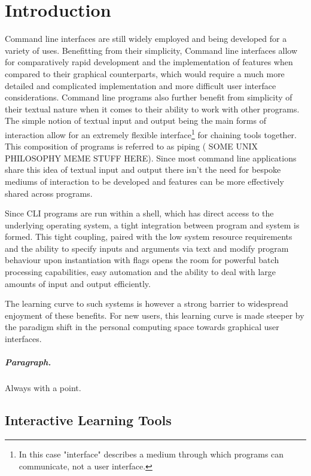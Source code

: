 \chapter{Introduction}
\label{chap:intro}

Command line interfaces are still widely employed and being developed for a
variety of uses. Benefitting from their simplicity, Command line interfaces
allow for comparatively rapid development and the implementation of features
when compared to their graphical counterparts, which would require a much more
detailed and complicated implementation and more difficult user interface
considerations. Command line programs also further benefit from simplicity of
their textual nature when it comes to their ability to work with other
programs. The simple notion of textual input and output being the main forms of
interaction allow for an extremely flexible interface\footnote{In this case
"interface" describes a medium through which programs can communicate, not a
user interface.} for chaining tools together. This composition of programs is
referred to as piping ( SOME UNIX PHILOSOPHY MEME STUFF
HERE)\cite{mcilroy1978unix}. Since most command line applications share this
idea of textual input and output there isn't the need for bespoke mediums of
interaction to be developed and features can be more effectively shared across
programs.

Since CLI programs are run within a shell, which has direct access to the
underlying operating system, a tight integration between program and system is
formed. This tight coupling, paired with the low system resource requirements
and the ability to specify inputs and arguments via text and modify program
behaviour upon instantiation with flags opens the room for powerful batch
processing capabilities, easy automation and the ability to deal with large
amounts of input and output efficiently.

The learning curve to such systems is however a strong barrier to widespread
enjoyment of these benefits. For new users, this learning curve is made steeper
by the paradigm shift in the personal computing space towards graphical user
interfaces.

\paragraph{Paragraph.} Always with a point.

\section{Interactive Learning Tools} 

